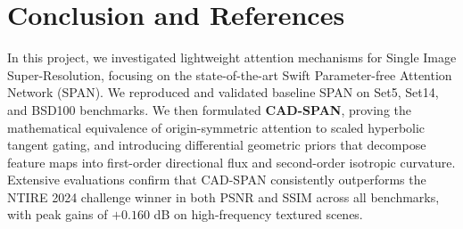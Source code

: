 \documentclass[conference]{IEEEtran}
\begin{document}
\section{Conclusion and References}
In this project, we investigated lightweight attention mechanisms for Single Image Super-Resolution, focusing on the state-of-the-art Swift Parameter-free Attention Network (SPAN). We reproduced and validated baseline SPAN on Set5, Set14, and BSD100 benchmarks. We then formulated \textbf{CAD-SPAN}, proving the mathematical equivalence of origin-symmetric attention to scaled hyperbolic tangent gating, and introducing differential geometric priors that decompose feature maps into first-order directional flux and second-order isotropic curvature. Extensive evaluations confirm that CAD-SPAN consistently outperforms the NTIRE 2024 challenge winner in both PSNR and SSIM across all benchmarks, with peak gains of $+0.160$ dB on high-frequency textured scenes.
\end{document}
